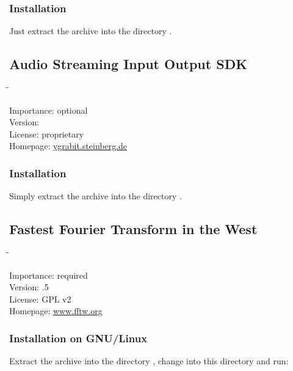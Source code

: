 \subsubsection{Installation}

Just extract the archive into the directory
.

\subsection{Audio Streaming Input Output SDK}

\begin{tabbing}
  \hspace*{6em}\=\=\kill

  Importance:  \> optional \\
  Version:      \\
  License:     \> proprietary \\
  Homepage:    \> \href{http://ygrabit.steinberg.de/}{ygrabit.steinberg.de}
\end{tabbing}

\subsubsection{Installation}

Simply extract the archive into the directory
.

\subsection{Fastest Fourier Transform in the West}

\begin{tabbing}
  \hspace*{6em}\=\=\kill

  Importance:  \> required \\
  Version:     .5 \\
  License:     \> GPL v2 \\
  Homepage:    \> \href{http://www.fftw.org/}{www.fftw.org}
\end{tabbing}

\subsubsection{Installation on GNU/Linux}

Extract the archive into the directory , change
into this directory and run:

